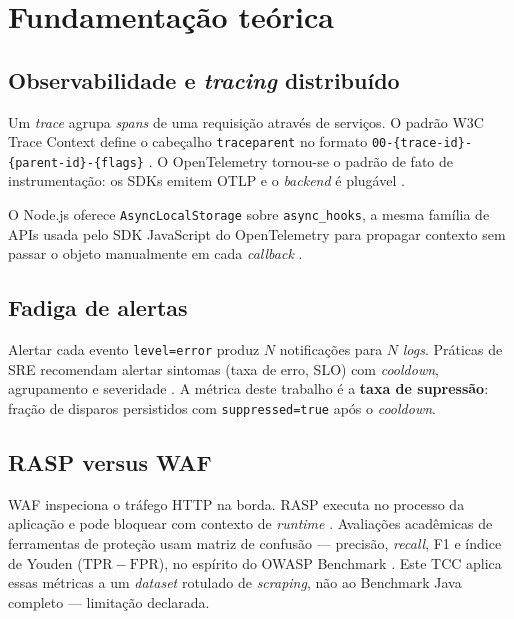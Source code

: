 \documentclass[
  12pt,
  oneside,
  a4paper,
  english,
  brazil,
  sumario=tradicional
]{abntex2}
\begin{document}
\chapter{Fundamentação teórica}

\section{Observabilidade e \textit{tracing} distribuído}

Um \textit{trace} agrupa \textit{spans} de uma requisição através de serviços. O padrão W3C Trace Context define o cabeçalho \texttt{traceparent} no formato \texttt{00-\{trace-id\}-\{parent-id\}-\{flags\}} \cite{w3c2021tracecontext}. O OpenTelemetry tornou-se o padrão de fato de instrumentação: os SDKs emitem OTLP e o \textit{backend} é plugável \cite{opentelemetry2026,jaeger2026,signoz2026}.

O Node.js oferece \texttt{AsyncLocalStorage} sobre \texttt{async\_hooks}, a mesma família de APIs usada pelo SDK JavaScript do OpenTelemetry para propagar contexto sem passar o objeto manualmente em cada \textit{callback} \cite{nodejsAls}.

\section{Fadiga de alertas}

Alertar cada evento \texttt{level=error} produz $N$ notificações para $N$ \textit{logs}. Práticas de SRE recomendam alertar sintomas (taxa de erro, SLO) com \textit{cooldown}, agrupamento e severidade \cite{beyer2016sre}. A métrica deste trabalho é a \textbf{taxa de supressão}: fração de disparos persistidos com \texttt{suppressed=true} após o \textit{cooldown}.

\section{RASP versus WAF}

WAF inspeciona o tráfego HTTP na borda. RASP executa no processo da aplicação e pode bloquear com contexto de \textit{runtime} \cite{impervaRasp}. Avaliações acadêmicas de ferramentas de proteção usam matriz de confusão --- precisão, \textit{recall}, F1 e índice de Youden ($\mathrm{TPR}-\mathrm{FPR}$), no espírito do OWASP Benchmark \cite{owaspBenchmark}. Este TCC aplica essas métricas a um \textit{dataset} rotulado de \textit{scraping}, não ao Benchmark Java completo --- limitação declarada.
\end{document}
